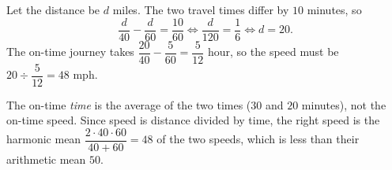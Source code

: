 Let the distance be $d$ miles. The two travel times differ by $10$ minutes, so
\[
\dfrac {d}{40}-\dfrac {d}{60}=\dfrac{10}{60}\iff\dfrac {d}{120}=\dfrac{1}{6}\iff d=20.
\]
The on-time journey takes $\dfrac{20}{40}-\dfrac{5}{60}=\dfrac{5}{12}$ hour, so the speed must be $20\div\dfrac{5}{12}=\boxed{48\text{ mph}}$.

The on-time \emph{time} is the average of the two times ($30$ and $20$ minutes), not the on-time speed. Since speed is distance divided by time, the right speed is the harmonic mean $\dfrac{2\cdot40\cdot60}{40+60}=48$ of the two speeds, which is less than their arithmetic mean $50$.
